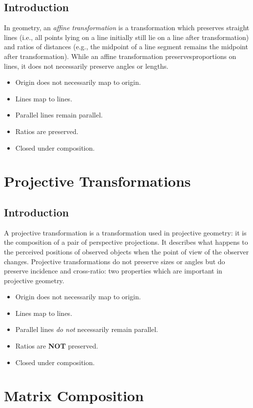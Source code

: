\documentclass[a4paper,12pt,titlepage,twosided]{article}
\begin{document}
	\subsection{Introduction}
	In geometry, an \emph{affine transformation} is a transformation which preserves straight lines (i.e., all points lying on a line initially still lie on a line after transformation) and ratios of distances (e.g., the midpoint of a line segment remains the midpoint after transformation). While an affine transformation preservesproportions on lines, it does not necessarily preserve angles or lengths.
	\begin{itemize}
	\item	Origin does not necessarily map to origin.
	\item	Lines map to lines.
	\item	Parallel lines remain parallel.
	\item	Ratios are preserved.
	\item	Closed under composition.
	\end{itemize}
\pagebreak
\section{Projective Transformations}
	\subsection{Introduction}
	A projective transformation is a transformation used in projective geometry: it is the composition of a pair of perspective projections. 
	It describes what happens to the perceived positions of observed objects when the point of view of the observer changes. Projective transformations 
	do not preserve sizes or angles but do preserve incidence and cross-ratio: two properties which are important in projective geometry.
	\begin{itemize}
	\item	Origin does not necessarily map to origin.
	\item	Lines map to lines.
	\item	Parallel lines \emph{do not} necessarily remain parallel.
	\item	Ratios are \textbf{NOT} preserved.
	\item	Closed under composition.
	\end{itemize}
\pagebreak
\section{Matrix Composition}
\end{document}

